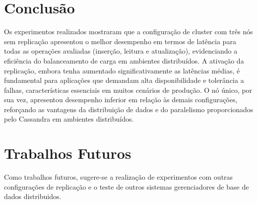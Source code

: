 \section{Conclusão}

Os experimentos realizados mostraram que a configuração de cluster com três nós sem replicação apresentou o melhor desempenho em termos de latência para
todas as operações avaliadas (inserção, leitura e atualização), evidenciando a eficiência do balanceamento de carga em ambientes distribuídos. 
A ativação da replicação, embora tenha aumentado significativamente as latências médias, é fundamental para aplicações que demandam alta disponibilidade 
e tolerância a falhas, características essenciais em muitos cenários de produção.
O nó único, por sua vez, apresentou desempenho inferior em relação às demais configurações,
reforçando as vantagens da distribuição de dados e do paralelismo proporcionados pelo Cassandra em ambientes distribuídos.

\section{Trabalhos Futuros}

Como trabalhos futuros, sugere-se a realização de experimentos com outras configurações de replicação e o teste de outros sistemas gerenciadores de base de dados distribuidos.
